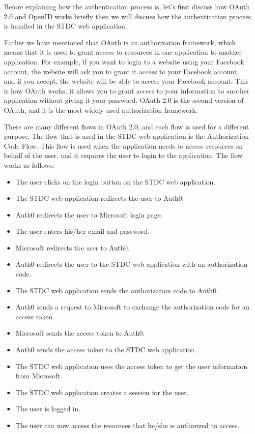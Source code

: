 \begin{justify}
        \vspace{0.25cm}
        \newendline Before explaining how the authentication process is, let's first discuss how OAuth 2.0 and OpenID works briefly then we will discuss how the authentication process is handled in the STDC web application.

        \vspace{0.25cm}
        \newendline Earlier we have mentioned that OAuth is an authorization framework, which means that it is used to grant access to resources in one application to another application. For example, if you want to login to a website using your Facebook account, the website will ask you to grant it access to your Facebook account, and if you accept, the website will be able to access your Facebook account. This is how OAuth works, it allows you to grant access to your information to another application without giving it your password. OAuth 2.0 is the second version of OAuth, and it is the most widely used authorization framework.
    
        \vspace{0.25cm}
        \newendline There are many different flows in OAuth 2.0, and each flow is used for a different purpose. The flow that is used in the STDC web application is the Authorization Code Flow. This flow is used when the application needs to access resources on behalf of the user, and it requires the user to login to the application. The flow works as follows:
    
        \begin{itemize}
            \item The user clicks on the login button on the STDC web application.
            \item The STDC web application redirects the user to Auth0.
            \item Auth0 redirects the user to Microsoft login page.
            \item The user enters his/her email and password.
            \item Microsoft redirects the user to Auth0.
            \item Auth0 redirects the user to the STDC web application with an authorization code.
            \item The STDC web application sends the authorization code to Auth0.
            \item Auth0 sends a request to Microsoft to exchange the authorization code for an access token.
            \item Microsoft sends the access token to Auth0.
            \item Auth0 sends the access token to the STDC web application.
            \item The STDC web application uses the access token to get the user information from Microsoft.
            \item The STDC web application creates a session for the user.
            \item The user is logged in.
            \item The user can now access the resources that he/she is authorized to access.
        \end{itemize}


\end{justify}
